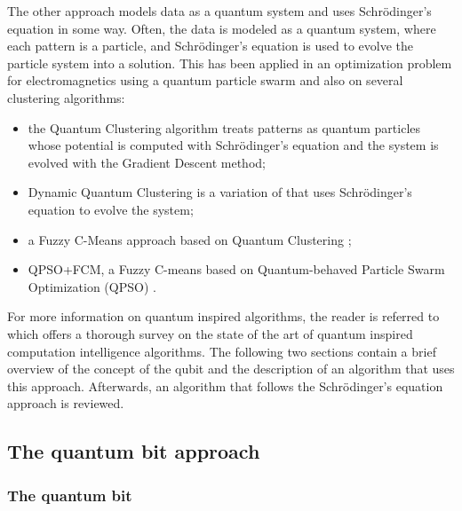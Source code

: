 The other approach models data as a quantum system and uses Schrödinger's equation in some way.
Often, the data is modeled as a quantum system, where each pattern is a particle, and Schrödinger's equation is used to evolve the particle system into a solution.
This has been applied in an optimization problem for electromagnetics using a quantum particle swarm \cite{mikki2006quantum} and also on several clustering algorithms:
\begin{itemize}
	\item the Quantum Clustering \cite{Horn2001b} algorithm treats patterns as quantum particles whose potential is computed with Schrödinger's equation and the system is evolved with the Gradient Descent method;

	\item Dynamic Quantum Clustering \cite{Weinstein2009b} is a variation of \citet{Horn2001b} that uses Schrödinger's equation to evolve the system;

	\item a Fuzzy C-Means approach \cite{li2007quantum} based on Quantum Clustering \cite{Horn2001b};

	\item QPSO+FCM, a Fuzzy C-means \cite{Wang2007} based on Quantum-behaved Particle Swarm Optimization (QPSO) \cite{Sun2004}.

\end{itemize}

For more information on quantum inspired algorithms, the reader is referred to \citet{Manju2014} which offers a thorough survey on the state of the art of quantum inspired computation intelligence algorithms.
The following two sections contain a brief overview of the concept of the qubit and the description of an algorithm that uses this approach.
Afterwards, an algorithm that follows the Schrödinger's equation approach is reviewed.

\subsection{The quantum bit approach}
\label{sec:qubit}

\subsubsection{The quantum bit}

